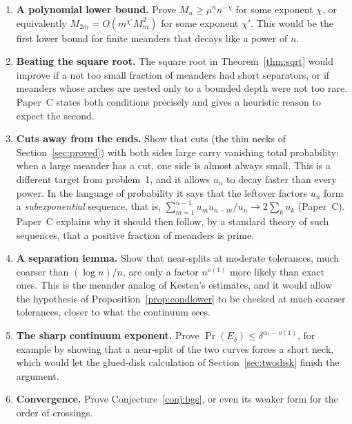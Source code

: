 \begin{enumerate}
\item \textbf{A polynomial lower bound.} Prove $M_n\ge\mu^n n^{-\chi}$ for some exponent $\chi$,
or equivalently $M_{2m}=O(m^{\chi'}M_m^2)$ for some exponent $\chi'$. This would be the
first lower bound for finite meanders that decays like a power of $n$.
\item \textbf{Beating the square root.} The square root in Theorem~\ref{thm:sqrt} would improve if
a not too small fraction of meanders had short separators, or if meanders whose arches are nested
only to a bounded depth were not too rare. Paper~C states both conditions precisely and gives a
heuristic reason to expect the second.
\item \textbf{Cuts away from the ends.} Show that cuts (the thin necks of
Section~\ref{sec:proved}) with both sides large carry vanishing total probability: when a large
meander has a cut, one side is almost always small. This is a different target from problem~1, and
it allows $u_n$ to decay faster than every power. In the
language of probability it says that the leftover factors $u_n$ form a \emph{subexponential}
sequence, that is, $\sum_{m=1}^{n-1}u_mu_{n-m}/u_n\to2\sum_k u_k$ (Paper~C). Paper~C explains why
it should then follow, by a standard theory of such sequences, that a positive fraction of
meanders is prime.
\item \textbf{A separation lemma.} Show that near-splits at moderate tolerances, much coarser than
$(\log n)/n$, are only a factor $n^{o(1)}$ more likely than exact ones. This is the meander analog
of Kesten's estimates, and it would allow the hypothesis of Proposition~\ref{prop:condlower} to be
checked at much coarser tolerances, closer to what the continuum sees.
\item \textbf{The sharp continuum exponent.} Prove $\Pr(E_\delta)\le\delta^{\alpha_*-o(1)}$, for
example by showing that a near-split of the two curves forces a short neck, which would let the
glued-disk calculation of Section~\ref{sec:twodisk} finish the argument.
\item \textbf{Convergence.} Prove Conjecture~\ref{conj:bgs}, or even its weaker form for the
order of crossings.
\end{enumerate}

